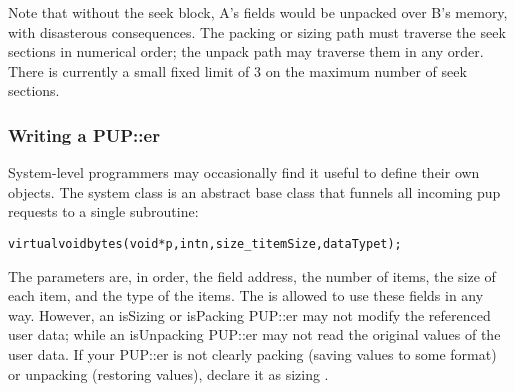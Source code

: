 Note that without the seek block, A's fields would be unpacked
over B's memory, with disasterous consequences.
The packing or sizing path must traverse the seek sections
in numerical order; the unpack path may traverse them in any
order.  There is currently a small fixed limit of 3 on the 
maximum number of seek sections.


\subsubsection{Writing a PUP::er}
System-level programmers may occasionally find it useful to define
their own  objects.  The system  class is 
an abstract base class that funnels all incoming pup requests
to a single subroutine:

\begin{alltt}
    virtual void bytes(void *p,int n,size\_t itemSize,dataType t);
\end{alltt}

The parameters are, in order, the field address, the number of items,
the size of each item, and the type of the items. The 
is allowed to use these fields in any way.  However, an isSizing
or isPacking PUP::er may not modify the referenced user data; 
while an isUnpacking PUP::er may not read the original values of 
the user data.  If your PUP::er is not clearly packing (saving values
to some format) or unpacking (restoring values), declare it as 
sizing .



